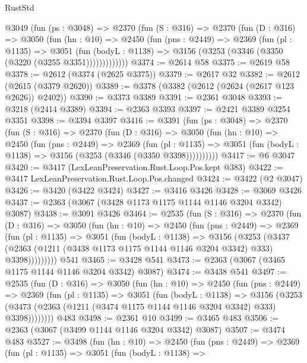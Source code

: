 \begin{lexlean}{RustStd}
\begin{coremodule}
    @3049
      (fun (ps : @3048) =>
      @2370
        (fun (S : @316) =>
        @2370
          (fun (D : @316) =>
          @3050
            (fun (hn : @10) =>
            @2450
              (fun (pns : @2449) =>
              @2369
                (fun (pl : @1135) =>
                @3051
                  (fun (bodyL : @1138) =>
                  @3156 (@3253 (@3346 (@3350 (@3220 (@3255 @3351)))))))))))))
@3374 := @2614 @58
@3375 := @2619 @58
@3378 := @2612 (@3374 (@2625 @3375))
@3379 := @2617 @32
@3382 := @2612 (@2615 (@3379 @2620))
@3389 := @3378 (@3382 (@2612 (@2624 (@2617 @123 @2626)) @2402))
@3390 := @3373 @3389
@3391 := @2361 @3048
@3393 := @3218 (@2414 @3389)
@3394 := @2363 @3393
@3397 := @2421 @3389 @3254 @3351
@3398 := @3394 @3397
@3416 := @3391
    (fun (ps : @3048) =>
    @2370
      (fun (S : @316) =>
      @2370
        (fun (D : @316) =>
        @3050
          (fun (hn : @10) =>
          @2450
            (fun (pns : @2449) =>
            @2369
              (fun (pl : @1135) =>
              @3051 (fun (bodyL : @1138) => @3156 (@3253 (@3346 (@3350 @3398))))))))))
@3417 := @6 @3047
@3420 := @3417 (LexLeanPreservation.Rust.Loop.Pos.kept @383)
@3422 := @3417 LexLeanPreservation.Rust.Loop.Pos.changed
@3424 := @3422 (@2 @3047)
@3426 := @3420 (@3422 @3424)
@3427 := @3416 @3426
@3428 := @3069 @3426
@3437 := @2363 (@3067 (@3428 @1173 @1175 @1144 @1146 @3204 @3342) @3087)
@3438 := @3091 @3426
@3464 := @2535
    (fun (S : @316) =>
    @2370
      (fun (D : @316) =>
      @3050
        (fun (hn : @10) =>
        @2450
          (fun (pns : @2449) =>
          @2369
            (fun (pl : @1135) =>
            @3051
              (fun (bodyL : @1138) =>
              @3156
                (@3253
                  (@3437
                    (@2363 (@1211 (@3438 @1173 @1175 @1144 @1146 @3204 @3342) @333) @3398)))))))))
    @541
@3465 := @3428 @541
@3473 := @2363 (@3067 (@3465 @1175 @1144 @1146 @3204 @3342) @3087)
@3474 := @3438 @541
@3497 := @2535
    (fun (D : @316) =>
    @3050
      (fun (hn : @10) =>
      @2450
        (fun (pns : @2449) =>
        @2369
          (fun (pl : @1135) =>
          @3051
            (fun (bodyL : @1138) =>
            @3156
              (@3253 (@3473 (@2363 (@1211 (@3474 @1175 @1144 @1146 @3204 @3342) @333) @3398))))))))
    @483
@3498 := @2361 @10
@3499 := @3465 @483
@3506 := @2363 (@3067 (@3499 @1144 @1146 @3204 @3342) @3087)
@3507 := @3474 @483
@3527 := @3498
    (fun (hn : @10) =>
    @2450
      (fun (pns : @2449) =>
      @2369
        (fun (pl : @1135) =>
        @3051
          (fun (bodyL : @1138) =>

\end{coremodule}
\end{lexlean}
